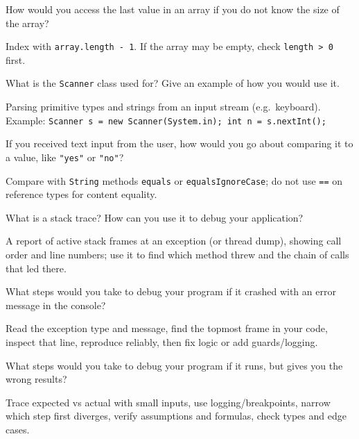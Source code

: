 \newpage

\question[4]
How would you access the last value in an array if you do not know the size of the array?
\begin{solutionorbox}[1in]
  Index with \texttt{array.length - 1}. If the array may be empty, check \texttt{length > 0} first.
\end{solutionorbox}

\question[4]
What is the \texttt{Scanner} class used for? Give an example of how you would use it.
\begin{solutionorbox}[1.45in]
  Parsing primitive types and strings from an input stream (e.g.\ keyboard). Example: \texttt{Scanner s = new Scanner(System.in); int n = s.nextInt();}
\end{solutionorbox}

\question[4]
If you received text input from the user, how would you go about comparing it to a value, like \texttt{"yes"} or \texttt{"no"}?
\begin{solutionorbox}[1.15in]
  Compare with \texttt{String} methods \texttt{equals} or \texttt{equalsIgnoreCase}; do not use \texttt{==} on reference types for content equality.
\end{solutionorbox}

\newpage

\question[4]
What is a stack trace? How can you use it to debug your application?
\begin{solutionorbox}[1.35in]
  A report of active stack frames at an exception (or thread dump), showing call order and line numbers; use it to find which method threw and the chain of calls that led there.
\end{solutionorbox}

\question[4]
What steps would you take to debug your program if it crashed with an error message in the console?
\begin{solutionorbox}[1.45in]
  Read the exception type and message, find the topmost frame in your code, inspect that line, reproduce reliably, then fix logic or add guards/logging.
\end{solutionorbox}

\question[4]
What steps would you take to debug your program if it runs, but gives you the wrong results?
\begin{solutionorbox}[1.45in]
  Trace expected vs actual with small inputs, use logging/breakpoints, narrow which step first diverges, verify assumptions and formulas, check types and edge cases.
\end{solutionorbox}

